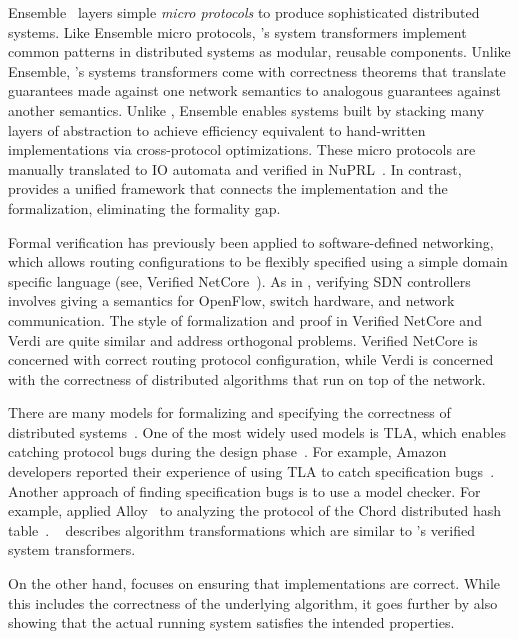 Ensemble~\cite{hayden:ensemble} layers simple \textit{micro protocols}
to produce sophisticated distributed systems. Like Ensemble micro
protocols, \Verdi's system transformers implement common patterns in
distributed systems as modular, reusable components.  Unlike Ensemble,
\Verdi's systems transformers come with correctness theorems that
translate guarantees made against one network semantics to analogous
guarantees against another semantics.  Unlike \Verdi, Ensemble enables
systems built by stacking many layers of abstraction to achieve
efficiency equivalent to hand-written implementations via
cross-protocol optimizations. These micro protocols are manually
translated to IO automata and verified in
NuPRL~\cite{liu:ensemble-nuprl,ensemble-verification}. In contrast,
\Verdi provides a unified framework that connects the implementation
and the formalization, eliminating the formality gap.

 Formal verification has previously been applied to
software-defined networking, which allows routing configurations to be
flexibly specified using a simple domain specific language (see, \eg
Verified NetCore~\cite{guha:verified-openflow}).  As in \Verdi,
verifying SDN controllers involves giving a semantics for OpenFlow,
switch hardware, and network communication. The style of formalization
and proof in Verified NetCore and Verdi are quite similar and address orthogonal
problems. Verified NetCore is concerned with correct routing protocol
configuration, while Verdi is concerned with the correctness of
distributed algorithms that run on top of the network.

There are many models for formalizing and specifying the correctness
of distributed systems~\cite{ioautomata,petrinets,pi-calculus}. One of the most
widely used models is TLA, which enables catching protocol bugs during
the design phase~\cite{lamport:thinking}.  For example, Amazon
developers reported their experience of using TLA to catch
specification bugs~\cite{Newcombe-al:CACM14}.  Another approach of finding
specification bugs is to use a model checker.  For example,
\citeauthor{zave:chord-alloy} applied Alloy~\cite{jackson:alloy} to
analyzing the protocol of the Chord distributed hash
table~\cite{zave:chord-alloy}. \citeauthor{Lynch:1996:DA:525656}~
describes algorithm transformations which are similar to \Verdi's
verified system transformers.

On the other hand, \Verdi focuses on ensuring that implementations
are correct.  While this includes the correctness of the underlying
algorithm, it goes further by also showing that the actual running
system satisfies the intended properties.

